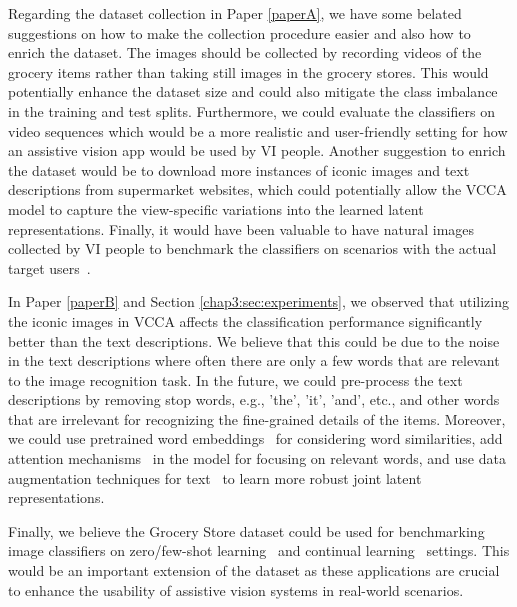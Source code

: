Regarding the dataset collection in Paper \ref{paperA}, we have some belated suggestions on how to make the collection procedure easier and also how to enrich the dataset. The images should be collected by recording videos of the grocery items rather than taking still images in the grocery stores. This would potentially enhance the dataset size and could also mitigate the class imbalance in the training and test splits. Furthermore, we could evaluate the classifiers on video sequences which would be a more realistic and user-friendly setting for how an assistive vision app would be used by VI people. Another suggestion to enrich the dataset would be to download more instances of iconic images and text descriptions from supermarket websites, which could potentially allow the VCCA model to capture the view-specific variations into the learned latent representations. Finally, it would have been valuable to have natural images collected by VI people to benchmark the classifiers on scenarios with the actual target users~\cite{jayant2011supporting,massiceti2021orbit}. 

In Paper \ref{paperB} and Section \ref{chap3:sec:experiments}, we observed that utilizing the iconic images in VCCA affects the classification performance significantly better than the text descriptions. We believe that this could be due to the noise in the text descriptions where often there are only a few words that are relevant to the image recognition task. In the future, we could pre-process the text descriptions by removing stop words, e.g., 'the', 'it', 'and', etc., and other words that are irrelevant for recognizing the fine-grained details of the items. Moreover, we could use pretrained word embeddings~\cite{mikolov2013distributed, pennington2014glove, lan2019albert} for considering word similarities, add attention mechanisms~\cite{luong2015effective, vaswani2017attention} in the model for focusing on relevant words, and use data augmentation techniques for text~\cite{wei2019eda} to learn more robust joint latent representations. 

Finally, we believe the Grocery Store dataset could be used for benchmarking image classifiers on zero/few-shot learning~\cite{xian2018zero, wang2020generalizing} and continual learning~\cite{delange2021continual, parisi2019continual} settings. 
This would be an important extension of the dataset as these applications are crucial to enhance the usability of assistive vision systems in real-world scenarios. 


